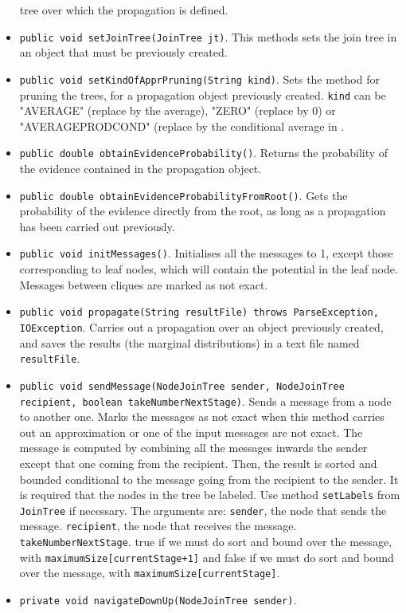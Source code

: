 \begin{itemize}
  tree over which the propagation is defined.
\item \texttt{public void setJoinTree(JoinTree jt)}. This
  methods sets the join tree in an object that must be previously
  created.
\item \texttt{public void setKindOfApprPruning(String kind)}.
  Sets the method for pruning the trees, for a propagation object
  previously created. \texttt{kind} can be "AVERAGE" (replace by the
  average), "ZERO" (replace by 0) or "AVERAGEPRODCOND"
  (replace by the conditional average in \cite{Can03}.
\item \texttt{public double obtainEvidenceProbability()}.
  Returns the probability of the evidence contained in the
  propagation object.
\item \texttt{public double obtainEvidenceProbabilityFromRoot()}.
  Gets the probability of the evidence directly from the root,
  as long as a propagation has been carried out previously.
\item \texttt{public void initMessages()}. Initialises all the messages
  to 1, except those corresponding to leaf nodes, which will contain
  the potential in the leaf node. Messages between cliques are marked
  as not exact.
\item \texttt{public void propagate(String resultFile) throws ParseException,
    IOException}. Carries out a propagation over an object
  previously created, and saves the results (the marginal
  distributions) in a text file named \texttt{resultFile}.
\item \texttt{public void sendMessage(NodeJoinTree sender,
    NodeJoinTree recipient, boolean takeNumberNextStage)}. Sends a
  message from a node to another one.
  Marks the messages as not exact when this method carries out
  an approximation or one of the input messages are not exact.
  The message is computed by combining all the messages inwards
  the sender except that one coming from the recipient. Then, the
  result is sorted and bounded conditional to the message
  going from the recipient to the sender.
  It is required that the nodes in the tree be labeled.
  Use method \texttt{setLabels} from \texttt{JoinTree} if
  necessary. The arguments are: \texttt{sender}, the node that sends
  the message. \texttt{recipient}, the node that receives the message.
  \texttt{takeNumberNextStage}. true if we must do
  sort and bound over the message, with
  \texttt{maximumSize[currentStage+1]} and false if we
  must do sort and bound over the message, with
  \texttt{maximumSize[currentStage]}.
\item \texttt{private void navigateDownUp(NodeJoinTree sender)}.

\end{itemize}
